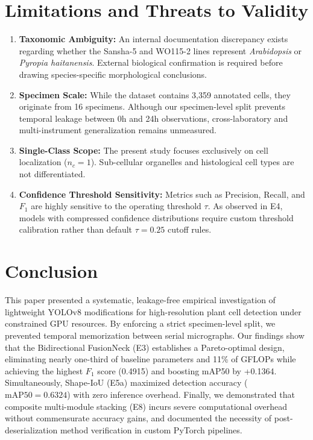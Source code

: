 \documentclass[conference]{IEEEtran}
\begin{document}
\section{Limitations and Threats to Validity}
\begin{enumerate}
    \item \textbf{Taxonomic Ambiguity:} An internal documentation discrepancy exists regarding whether the Sansha-5 and WO115-2 lines represent \textit{Arabidopsis} or \textit{Pyropia haitanensis}. External biological confirmation is required before drawing species-specific morphological conclusions.
    \item \textbf{Specimen Scale:} While the dataset contains 3,359 annotated cells, they originate from 16 specimens. Although our specimen-level split prevents temporal leakage between 0h and 24h observations, cross-laboratory and multi-instrument generalization remains unmeasured.
    \item \textbf{Single-Class Scope:} The present study focuses exclusively on cell localization ($n_c = 1$). Sub-cellular organelles and histological cell types are not differentiated.
    \item \textbf{Confidence Threshold Sensitivity:} Metrics such as Precision, Recall, and $F_1$ are highly sensitive to the operating threshold $\tau$. As observed in E4, models with compressed confidence distributions require custom threshold calibration rather than default $\tau=0.25$ cutoff rules.
\end{enumerate}

\section{Conclusion}
This paper presented a systematic, leakage-free empirical investigation of lightweight YOLOv8 modifications for high-resolution plant cell detection under constrained GPU resources. By enforcing a strict specimen-level split, we prevented temporal memorization between serial micrographs. Our findings show that the Bidirectional FusionNeck (E3) establishes a Pareto-optimal design, eliminating nearly one-third of baseline parameters and 11\% of GFLOPs while achieving the highest $F_1$ score (0.4915) and boosting mAP50 by +0.1364. Simultaneously, Shape-IoU (E5a) maximized detection accuracy ($\text{mAP50}=0.6324$) with zero inference overhead. Finally, we demonstrated that composite multi-module stacking (E8) incurs severe computational overhead without commensurate accuracy gains, and documented the necessity of post-deserialization method verification in custom PyTorch pipelines.
\end{document}
